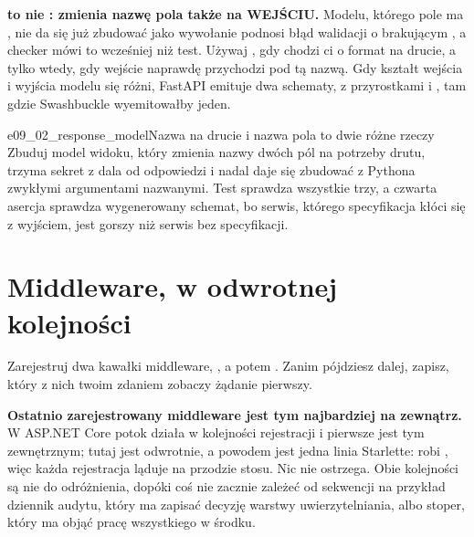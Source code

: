 \begin{trapbox}
\textbf{ to nie : zmienia nazwę pola także
na WEJŚCIU.} Modelu, którego pole ma , nie da się już
zbudować jako  \dash{} wywołanie podnosi błąd
walidacji o brakującym , a checker mówi to wcześniej niż
test. Używaj , gdy chodzi ci o format na drucie, a
 tylko wtedy, gdy wejście naprawdę przychodzi pod tą nazwą. Gdy
kształt wejścia i wyjścia modelu się różni, FastAPI emituje dwa schematy, z
przyrostkami  i , tam gdzie Swashbuckle wyemitowałby
jeden.
\end{trapbox}

\begin{exercise}{e09_02_response_model}{Nazwa na drucie i nazwa pola to dwie różne rzeczy}
Zbuduj model widoku, który zmienia nazwy dwóch pól na potrzeby drutu, trzyma
sekret z dala od odpowiedzi i nadal daje się zbudować z Pythona zwykłymi
argumentami nazwanymi. Test sprawdza wszystkie trzy, a czwarta asercja
sprawdza wygenerowany schemat, bo serwis, którego specyfikacja kłóci się z
wyjściem, jest gorszy niż serwis bez specyfikacji.
\end{exercise}

\section{Middleware, w odwrotnej kolejności}
\label{sec:ch09-middleware}

Zarejestruj dwa kawałki middleware, , a potem .
Zanim pójdziesz dalej, zapisz, który z nich twoim zdaniem zobaczy żądanie
pierwszy.



\begin{trapbox}
\textbf{Ostatnio zarejestrowany middleware jest tym najbardziej na zewnątrz.}
W ASP.NET Core potok działa w kolejności rejestracji i pierwsze
 jest tym zewnętrznym; tutaj jest odwrotnie, a powodem jest
jedna linia Starlette:  robi
, więc każda rejestracja ląduje na
przodzie stosu. Nic nie ostrzega. Obie kolejności są nie do odróżnienia,
dopóki coś nie zacznie zależeć od sekwencji \dash{} na przykład dziennik
audytu, który ma zapisać decyzję warstwy uwierzytelniania, albo stoper, który
ma objąć pracę wszystkiego w środku.
\end{trapbox}

